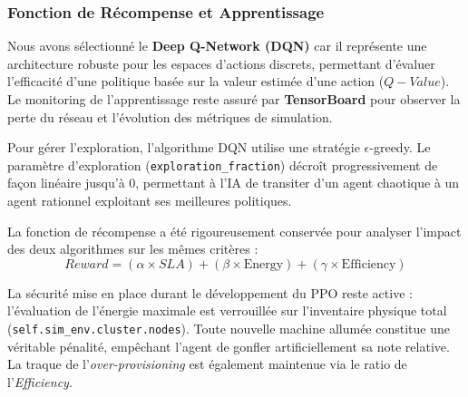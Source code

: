 \subsubsection{Fonction de Récompense et Apprentissage}
Nous avons sélectionné le \textbf{Deep Q-Network (DQN)} car il représente une architecture robuste pour les espaces d'actions discrets, permettant d'évaluer l'efficacité d'une politique basée sur la valeur estimée d'une action ($Q-Value$). Le monitoring de l'apprentissage reste assuré par \textbf{TensorBoard} pour observer la perte du réseau et l'évolution des métriques de simulation.

Pour gérer l'exploration, l'algorithme DQN utilise une stratégie $\epsilon$-greedy. Le paramètre d'exploration (\texttt{exploration\_fraction}) décroît progressivement de façon linéaire jusqu'à 0, permettant à l'IA de transiter d'un agent chaotique à un agent rationnel exploitant ses meilleures politiques.

La fonction de récompense a été rigoureusement conservée pour analyser l'impact des deux algorithmes sur les mêmes critères :
\begin{equation}
    Reward = (\alpha \times SLA) + (\beta \times \mathrm{Energy}) + (\gamma \times \mathrm{Efficiency})
\end{equation}

La sécurité mise en place durant le développement du PPO reste active : l'évaluation de l'énergie maximale est verrouillée sur l'inventaire physique total (\texttt{self.sim\_env.cluster.nodes}). Toute nouvelle machine allumée constitue une véritable pénalité, empêchant l'agent de gonfler artificiellement sa note relative. La traque de l'\textit{over-provisioning} est également maintenue via le ratio de l'\textit{Efficiency}.
